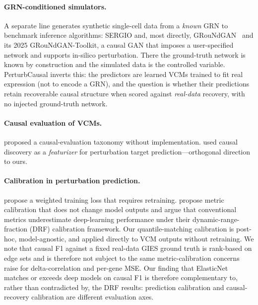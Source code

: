 \documentclass{article}
\theoremstyle{plain}
\theoremstyle{definition}
\theoremstyle{remark}
\begin{document}
\paragraph{GRN-conditioned simulators.} A separate line generates synthetic single-cell data from a \emph{known} GRN to benchmark inference algorithms: SERGIO and, most directly, GRouNdGAN~\citep{zinati2024groundgan} and its 2025 GRouNdGAN-Toolkit, a causal GAN that imposes a user-specified network and supports in-silico perturbation. There the ground-truth network is known by construction and the simulated data is the controlled variable. PerturbCausal inverts this: the predictors are learned VCMs trained to fit real expression (not to encode a GRN), and the question is whether their predictions retain recoverable causal structure when scored against \emph{real-data} recovery, with no injected ground-truth network.

\paragraph{Causal evaluation of VCMs.} \citet{vc_causal_2025} proposed a causal-evaluation taxonomy without implementation. \citet{wu2025cdn} used causal discovery as a \emph{featurizer} for perturbation target prediction---orthogonal direction to ours.

\paragraph{Calibration in perturbation prediction.} \citet{mejia2025diversity} propose a weighted training loss that requires retraining. \citet{miller2025calibrated} propose metric calibration that does not change model outputs and argue that conventional metrics underestimate deep-learning performance under their dynamic-range-fraction (DRF) calibration framework. Our quantile-matching calibration is post-hoc, model-agnostic, and applied directly to VCM outputs without retraining. We note that causal F1 against a fixed real-data GIES ground truth is rank-based on edge sets and is therefore not subject to the same metric-calibration concerns \citet{miller2025calibrated} raise for delta-correlation and per-gene MSE. Our finding that ElasticNet matches or exceeds deep models on causal F1 is therefore complementary to, rather than contradicted by, the DRF results: prediction calibration and causal-recovery calibration are different evaluation axes.

\end{document}
